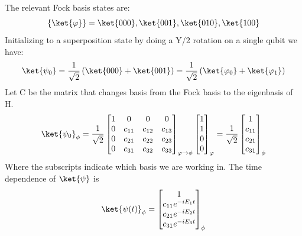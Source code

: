 The relevant Fock basis states are:
\begin{equation}
    \{\ket{\varphi\}} = \ket{000}, \ket{001}, \ket{010}, \ket{100}
\end{equation}
Initializing to a superposition state by doing a Y/2 rotation on a single qubit we have:
\begin{equation*}
    \ket{\psi_0} = \frac{1}{\sqrt{2}} \left( \ket{000} + \ket{001} \right) = \frac{1}{\sqrt{2}} \left( \ket{\varphi_0} + \ket{\varphi_1} \right)
\end{equation*}
Let C be the matrix that changes basis from the Fock basis to the eigenbasis of H.
\begin{equation}
    \ket{\psi_0}_{\phi} = \frac{1}{\sqrt{2}}
    \begin{bmatrix}
        1 & 0 & 0 & 0 \\
        0 & c_{11} & c_{12} & c_{13} \\
        0 & c_{21} & c_{22} & c_{23} \\
        0 & c_{31} & c_{32} & c_{33} \\
    \end{bmatrix}_{\varphi \rightarrow \phi}
    \begin{bmatrix}
        1 \\
        1 \\
        0 \\
        0 \\
    \end{bmatrix}_{\varphi}
    =
    \frac{1}{\sqrt{2}}
    \begin{bmatrix}
        1 \\
        c_{11} \\
        c_{21} \\
        c_{31} \\
    \end{bmatrix}_{\phi}
\end{equation}
Where the subscripts indicate which basis we are working in.
The time dependence of $\ket{\psi}$ is
\begin{equation}
    \ket{\psi(t)}_{\phi} =
    \begin{bmatrix}
        1 \\
        c_{11} e^{-i E_1 t} \\
        c_{21} e^{-i E_2 t} \\
        c_{31} e^{-i E_3 t}\\
    \end{bmatrix}_{\phi}
\end{equation}

